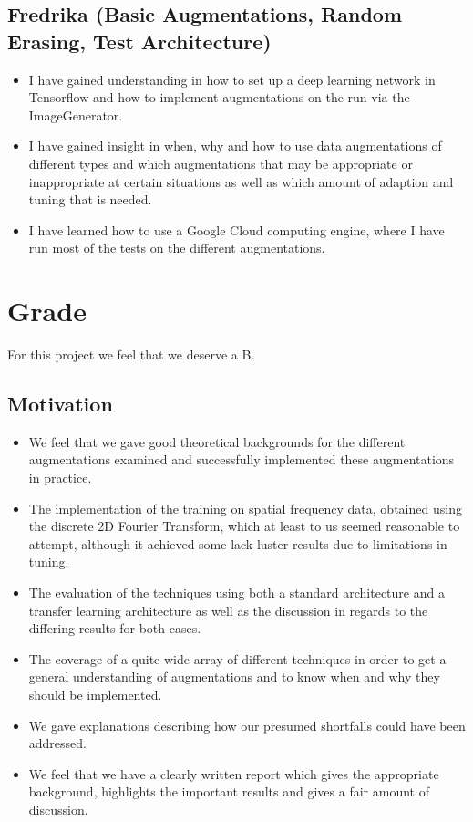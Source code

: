 \documentclass{article}
\begin{document}
\subsection*{Fredrika (Basic Augmentations, Random Erasing, Test Architecture)}

\begin{itemize}
	\item I have gained understanding in how to set up a deep learning network in Tensorflow and how to implement augmentations on the run via the ImageGenerator.
	
	\item I have gained insight in when, why and how to use data augmentations of different types and which augmentations that may be appropriate or inappropriate at certain situations as well as which amount of adaption and tuning that is needed.
	
	\item I have learned how to use a Google Cloud computing engine, where I have run most of the tests on the different augmentations.
	
	
	
	
\end{itemize}

\section*{Grade}

For this project we feel that we deserve a B. 

\subsection*{Motivation}

\begin{itemize}
 \item We feel that we gave good theoretical backgrounds for the different augmentations examined and successfully implemented these augmentations in practice. 
 \item The implementation of the training on spatial frequency data, obtained using the discrete 2D Fourier Transform, which at least to us seemed reasonable to attempt, although it achieved some lack luster results due to limitations in tuning.
 \item The evaluation of the techniques using both a standard architecture and a transfer learning architecture as well as the discussion in regards to the differing results for both cases.
 \item The coverage of a quite wide array of different techniques in order to get a general understanding of augmentations and to know when and why they should be implemented.
 \item We gave explanations describing how our presumed shortfalls could have been addressed.
 \item We feel that we have a clearly written report which gives the appropriate background, highlights the important results and gives a fair amount of discussion.
 
 
\end{itemize}
\end{document}
